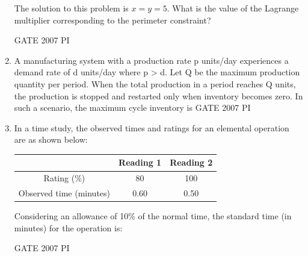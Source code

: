 \documentclass[journal,12pt,onecolumn]{IEEEtran}
\theoremstyle{remark}
\begin{document}
\begin{enumerate}
The solution to this problem is \( x = y = 5 \). 
What is the value of the Lagrange multiplier corresponding to the perimeter constraint?

\hfill{GATE 2007 PI}

\begin{enumerate}
\end{enumerate}

\item 
A manufacturing system with a production rate p units/day experiences a demand rate of d units/day where p > d. Let Q be the maximum production quantity per period. When the total production in a period reaches Q units, the production is stopped and restarted only when inventory becomes zero. In such a scenario, the maximum cycle inventory is
\hfill{GATE 2007 PI}
\begin{enumerate}
\end{enumerate}

\item 
In a time study, the observed times and ratings for an elemental operation are as shown below:

\begin{center}
\begin{tabular}{|c|c|c|}
\hline
 & {Reading 1} & {Reading 2} \\
\hline
{Rating (\%)} & 80 & 100 \\
\hline
{Observed time (minutes)} & 0.60 & 0.50 \\
\hline
\end{tabular}
\end{center}

Considering an allowance of 10\% of the normal time, the standard time (in minutes) for the operation is:

\hfill{GATE 2007 PI}


\end{enumerate}
\end{document}
